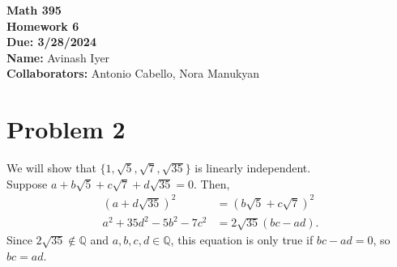 \documentclass[10pt]{extarticle}
\title{}
\author{}
\date{}
\newcommand{\Q}{\mathbb{Q}}
\begin{document}
  \begin{center}
    {\bf \Large Math 395 \\[0.1in]Homework 6 \\[0.1in]
    Due: 3/28/2024}\\[.25in]
    {\bf Name:} {Avinash Iyer}\\[0.15in]
    {\bf Collaborators:} {Antonio Cabello, Nora Manukyan} \\
  \end{center}
  \section{Problem 2}%
  We will show that $\{1,\sqrt{5},\sqrt{7},\sqrt{35}\}$ is linearly independent.\\

  Suppose $a + b\sqrt{5} + c\sqrt{7} + d\sqrt{35} = 0$. Then,
  \begin{align*}
    \left(a+d\sqrt{35}\right)^2 &= \left(b\sqrt{5} + c\sqrt{7}\right)^2\\
    a^2 + 35d^2 - 5b^2 - 7c^2 &= 2\sqrt{35}\left(bc-ad\right).
  \end{align*}
  Since $2\sqrt{35}\notin \Q$ and $a,b,c,d\in \Q$, this equation is only true if $bc-ad = 0$, so $bc = ad$.
\end{document}
